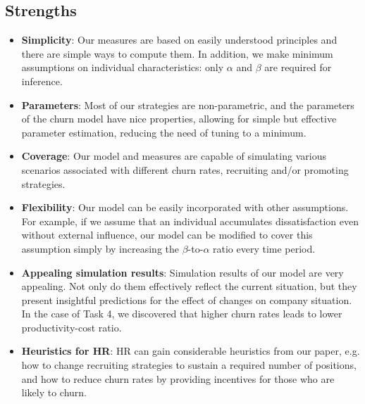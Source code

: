 \documentclass[tcn = 37075, sheet = false, abstract = false]{mcmthesis}
\begin{document}
\subsection{Strengths}
\begin{itemize}
\item \textbf{Simplicity}: Our measures are based on easily understood principles and there are simple ways to compute them. In addition, we make minimum assumptions on individual characteristics: only $\alpha$ and $\beta$ are required for inference. 
\item \textbf{Parameters}: Most of our strategies are non-parametric, and the parameters of the churn model have nice properties, allowing for simple but effective parameter estimation, reducing the need of tuning to a minimum.
\item \textbf{Coverage}: Our model and measures are capable of simulating various scenarios associated with different churn rates, recruiting and/or promoting strategies.
\item \textbf{Flexibility}: Our model can be easily incorporated with other assumptions. For example, if we assume that an individual accumulates dissatisfaction even without external influence, our model can be modified to cover this assumption simply by increasing the $\beta$-to-$\alpha$ ratio every time period.
\item \textbf{Appealing simulation results}: Simulation results of our model are very appealing. Not only do them effectively reflect the current situation, but they present insightful predictions for the effect of changes on company situation. In the case of Task 4, we discovered that higher churn rates leads to lower productivity-cost ratio. 
\item \textbf{Heuristics for HR}: HR can gain considerable heuristics from our paper, e.g. how to change recruiting strategies to sustain a required number of positions, and how to reduce churn rates by providing incentives for those who are likely to churn.

\end{itemize}
\end{document}
